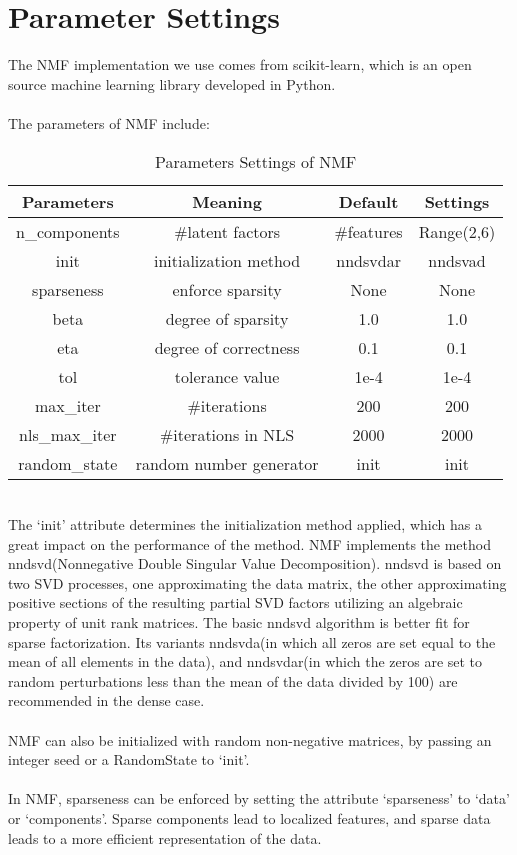 \documentclass[11pt]{article}
\begin{document}
\section{Parameter Settings}
The NMF implementation we use comes from scikit-learn\cite{sklearn}, which is an open source machine learning library developed in Python.\\
\\
The parameters of NMF include:
\begin{table}[ht]
\caption{Parameters Settings of NMF}
\centering
\begin{tabular}{c c c c}
\hline\hline
Parameters & Meaning & Default & Settings\\[1ex]
\hline
n\_components & \#latent factors & \#features & Range(2,6) \\
\hline
init & initialization method & nndsvdar & nndsvad\\
sparseness & enforce sparsity & None & None \\
beta & degree of sparsity & 1.0 & 1.0 \\
eta & degree of correctness & 0.1 & 0.1\\
\hline
tol & tolerance value & 1e-4 & 1e-4\\
max\_iter & \#iterations & 200 & 200\\
nls\_max\_iter & \#iterations in NLS & 2000 & 2000\\
random\_state & random number generator & init & init\\[1ex]
\hline
\end{tabular}
\label{NMF_setting}
\end{table}
\\
The `init' attribute determines the initialization method applied, which has a great impact on the performance of the method. NMF implements the method nndsvd(Nonnegative Double Singular Value Decomposition). nndsvd is based on two SVD processes, one approximating the data matrix, the other approximating positive sections of the resulting partial SVD factors utilizing an algebraic property of unit rank matrices. The basic nndsvd algorithm is better fit for sparse factorization. Its variants nndsvda(in which all zeros are set equal to the mean of all elements in the data), and nndsvdar(in which the zeros are set to random perturbations less than the mean of the data divided by 100) are recommended in the dense case.\\
\\
NMF can also be initialized with random non-negative matrices, by passing an integer seed or a RandomState to `init'.\\
\\
In NMF, sparseness can be enforced by setting the attribute `sparseness' to `data' or `components'. Sparse components lead to localized features, and sparse data leads to a more efficient representation of the data.
\end{document}
